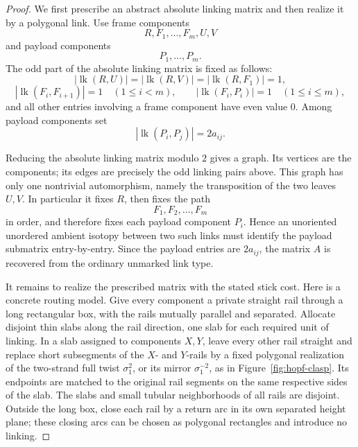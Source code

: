 \documentclass[11pt]{article}
\theoremstyle{remark}
\theoremstyle{plain}
\begin{document}
\begin{proof}
We first prescribe an abstract absolute linking matrix and then realize it by a
polygonal link.  Use frame components
\[
    R,F_1,\ldots,F_m,U,V
\]
and payload components
\[
    P_1,\ldots,P_m.
\]
The odd part of the absolute linking matrix is fixed as follows:
\[
    |\operatorname{lk}(R,U)|
    =
    |\operatorname{lk}(R,V)|
    =
    |\operatorname{lk}(R,F_1)|
    =
    1,
\]
\[
    |\operatorname{lk}(F_i,F_{i+1})|=1\quad(1\le i<m),
    \qquad
    |\operatorname{lk}(F_i,P_i)|=1\quad(1\le i\le m),
\]
and all other entries involving a frame component have even value \(0\).  Among
payload components set
\[
    |\operatorname{lk}(P_i,P_j)|=2a_{ij}.
\]

Reducing the absolute linking matrix modulo \(2\) gives a graph.  Its vertices
are the components; its edges are precisely the odd linking pairs above.  This
graph has only one nontrivial automorphism, namely the transposition of the two
leaves \(U,V\).  In particular it fixes \(R\), then fixes the path
\[
    F_1,F_2,\ldots,F_m
\]
in order, and therefore fixes each payload component \(P_i\).  Hence an
unoriented unordered ambient isotopy between two such links must identify the
payload submatrix entry-by-entry.  Since the payload entries are \(2a_{ij}\),
the matrix \(A\) is recovered from the ordinary unmarked link type.

It remains to realize the prescribed matrix with the stated stick cost.  Here
is a concrete routing model.  Give every component a private straight rail
through a long rectangular box, with the rails mutually parallel and
separated.  Allocate disjoint thin slabs along the rail direction, one slab
for each required unit of linking.  In a slab assigned to components \(X,Y\),
leave every other rail straight and replace short subsegments of the \(X\)-
and \(Y\)-rails by a fixed polygonal realization of the two-strand full twist
\(\sigma_1^2\), or its mirror \(\sigma_1^{-2}\), as in
Figure~\ref{fig:hopf-clasp}.  Its endpoints are matched to the original rail
segments on the same respective sides of the slab.  The slabs and small
tubular neighborhoods of all rails are disjoint.  Outside the long box, close
each rail by a return arc in its own separated height plane; these closing arcs
can be chosen as polygonal rectangles and introduce no linking.


\end{proof}
\end{document}
